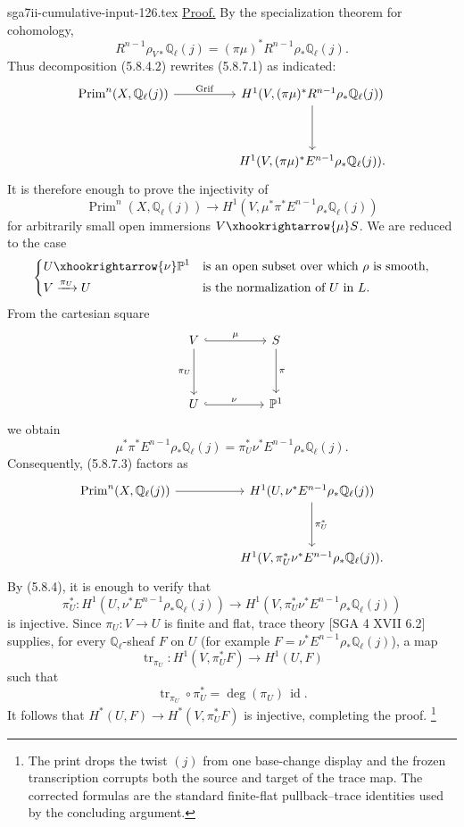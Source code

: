 \begin{filecontents*}{sga7ii-cumulative-input-126.tex}
\underline{Proof.}
By the specialization theorem for cohomology,
\[
R^{n-1}\rho_{V*}\mathbb Q_\ell(j)
=(\pi\mu)^*R^{n-1}\rho_*\mathbb Q_\ell(j).
\]
Thus decomposition (5.8.4.2) rewrites (5.8.7.1) as indicated:
\[
\begin{tikzcd}[column sep=huge,row sep=huge]
\operatorname{Prim}^n(X,\mathbb Q_\ell(j))
  \arrow[r,"\operatorname{Grif}"]
& H^1(V,(\pi\mu)^*R^{n-1}\rho_*\mathbb Q_\ell(j)) \arrow[d] \\
{}
& H^1(V,(\pi\mu)^*E^{n-1}\rho_*\mathbb Q_\ell(j)).
\end{tikzcd}
\]
It is therefore enough to prove the injectivity of
\begin{equation}\tag{5.8.7.3}
\operatorname{Prim}^n(X,\mathbb Q_\ell(j))
\longrightarrow
H^1(V,\mu^*\pi^*E^{n-1}\rho_*\mathbb Q_\ell(j))
\end{equation}
for arbitrarily small open immersions $V\xhookrightarrow{\mu}S$.  We are
reduced to the case
\[
\left\{
\begin{aligned}
U&\xhookrightarrow{\nu}\mathbb P^1
   &&\text{is an open subset over which $\rho$ is smooth},\\
V&\xrightarrow{\pi_U}U
   &&\text{is the normalization of $U$ in $L$}.
\end{aligned}
\right.
\]
From the cartesian square
\[
\begin{tikzcd}[column sep=huge,row sep=huge]
V\arrow[r,hook,"\mu"]\arrow[d,"\pi_U"']
&S\arrow[d,"\pi"]\\
U\arrow[r,hook,"\nu"]
&\mathbb P^1
\end{tikzcd}
\]
we obtain
\[
\mu^*\pi^*E^{n-1}\rho_*\mathbb Q_\ell(j)
=\pi_U^*\nu^*E^{n-1}\rho_*\mathbb Q_\ell(j).
\]
Consequently, (5.8.7.3) factors as
\[
\begin{tikzcd}[column sep=huge,row sep=huge]
\operatorname{Prim}^n(X,\mathbb Q_\ell(j)) \arrow[r]
&H^1(U,\nu^*E^{n-1}\rho_*\mathbb Q_\ell(j))
  \arrow[d,"\pi_U^*"] \\
{}
&H^1(V,\pi_U^*\nu^*E^{n-1}\rho_*\mathbb Q_\ell(j)).
\end{tikzcd}
\]
By (5.8.4), it is enough to verify that
\[
\pi_U^*:H^1(U,\nu^*E^{n-1}\rho_*\mathbb Q_\ell(j))
\longrightarrow
H^1(V,\pi_U^*\nu^*E^{n-1}\rho_*\mathbb Q_\ell(j))
\]
is injective.  Since $\pi_U:V\to U$ is finite and flat, trace theory
[SGA 4 XVII 6.2] supplies, for every $\mathbb Q_\ell$-sheaf $F$ on $U$
(for example $F=\nu^*E^{n-1}\rho_*\mathbb Q_\ell(j)$), a map
\[
\operatorname{tr}_{\pi_U}:H^1(V,\pi_U^*F)\longrightarrow H^1(U,F)
\]
such that
\[
\operatorname{tr}_{\pi_U}\circ\pi_U^*
=\deg(\pi_U)\,\operatorname{id}.
\]
It follows that $H^*(U,F)\to H^*(V,\pi_U^*F)$ is injective, completing
the proof.
\footnote{The print drops the twist $(j)$ from one base-change display and
the frozen transcription corrupts both the source and target of the trace
map.  The corrected formulas are the standard finite-flat pullback--trace
identities used by the concluding argument.}
\end{filecontents*}
